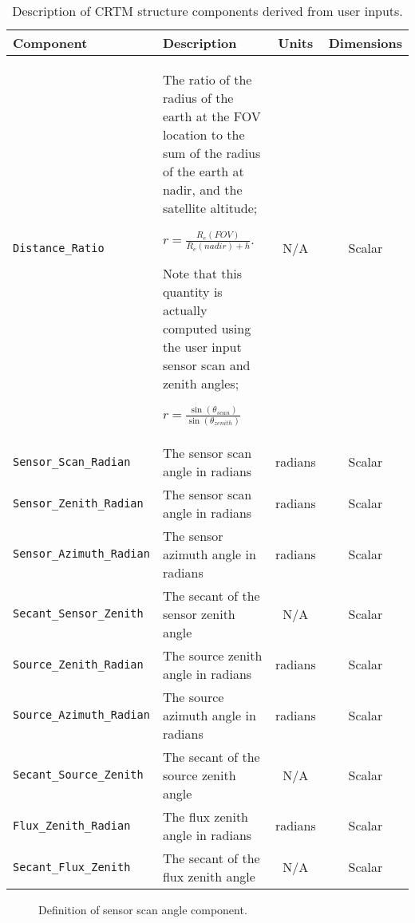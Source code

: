 \begin{table}[htp]
  \centering
  \begin{tabular}{l p{7cm} c c}
    \hline
    \sffamily\textbf{Component} & \sffamily\textbf{Description} & \sffamily\textbf{Units} & \sffamily\textbf{Dimensions} \\
    \hline\hline
    \texttt{Distance\_Ratio}         & The ratio of the radius of the earth at the FOV location to the sum of the radius of the earth at nadir, and the satellite altitude;
    
     \mbox{\hspace{1cm}$r = \displaystyle\frac{R_e(FOV)}{R_e(nadir) + h}$}.
     
     Note that this quantity is actually computed using the user input sensor scan and zenith angles; 
     
     \mbox{\hspace{1cm}$r = \displaystyle\frac{\sin(\theta_{scan})}{\sin(\theta_{zenith})}$} & N/A & Scalar \\
    \texttt{Sensor\_Scan\_Radian}    & The sensor scan angle in radians & radians & Scalar \\
    \texttt{Sensor\_Zenith\_Radian}  & The sensor scan angle in radians & radians & Scalar \\
    \texttt{Sensor\_Azimuth\_Radian} & The sensor azimuth angle in radians & radians & Scalar \\
    \texttt{Secant\_Sensor\_Zenith}  & The secant of the sensor zenith angle & N/A & Scalar \\
    \texttt{Source\_Zenith\_Radian}  & The source zenith angle in radians & radians & Scalar \\
    \texttt{Source\_Azimuth\_Radian} & The source azimuth angle in radians & radians & Scalar \\
    \texttt{Secant\_Source\_Zenith}  & The secant of the source zenith angle & N/A & Scalar \\
    \texttt{Flux\_Zenith\_Radian}    & The flux zenith angle in radians & radians & Scalar \\
    \texttt{Secant\_Flux\_Zenith}    & The secant of the flux zenith angle & N/A & Scalar \\
    \hline
  \end{tabular}
  \caption{Description of CRTM \GeometryInfo{} structure components derived from user inputs.}
  \label{tab:derived_geometryinfo_structure}
\end{table}

\begin{figure}[htp]
  \centering
  
  \caption{Definition of \GeometryInfo{} sensor scan angle component.}
  \label{fig:gInfo_sensor_scan_angle}
\end{figure}

